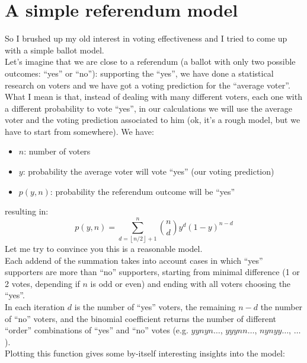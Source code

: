 \documentclass[10pt,a4paper]{article}
\begin{document}
	\section{A simple referendum model}
	So I brushed up my old interest in voting effectiveness and I tried to come up with a simple ballot model.\\
	Let’s imagine that we are close to a referendum (a ballot with only two possible outcomes: \enquote{yes} or \enquote{no}): supporting the \enquote{yes}, we have done a statistical research on voters and we have got a voting prediction for the \enquote{average voter}. What I mean is that, instead of dealing with many different voters, each one with a different probability to vote \enquote{yes}, in our calculations we will use the average voter and the voting prediction associated to him (ok, it’s a rough model, but we have to start from somewhere). We have:
	\begin{itemize}
		\item $n$: number of voters
		\item $y$: probability the average voter will vote \enquote{yes} (our voting prediction)
		\item $p(y,n)$: probability the referendum outcome will be \enquote{yes}
	\end{itemize}
	resulting in:
	\begin{equation*}
		p(y,n)=\sum_{d=\left \lfloor n/2 \right \rfloor +1}^{n} \binom{n}{d} y^{d} (1-y)^{n-d}
	\end{equation*}
	Let me try to convince you this is a reasonable model.\\
	Each addend of the summation takes into account cases in which \enquote{yes} supporters are more than \enquote{no} supporters, starting from minimal difference (1 or 2 votes, depending if $n$ is odd or even) and ending with all voters choosing the \enquote{yes}.\\
	In each iteration $d$ is the number of \enquote{yes} voters, the remaining $n-d$ the number of \enquote{no} voters, and the binomial coefficient returns the number of different \enquote{order} combinations of \enquote{yes} and \enquote{no} votes (e.g. $yynyn \dots$, $yyynn\dots$, $nynyy\dots$, $\dots$).\\
	Plotting this function gives some by-itself interesting insights into the model:
\end{document}
